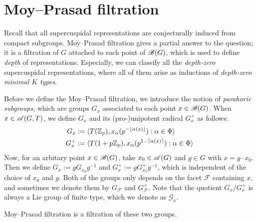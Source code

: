 \section{Moy--Prasad filtration}
\label{sec:moyprasad}

Recall that all supercuspidal representations are conjecturally induced from compact subgroups.
Moy--Prasad filtration gives a partial answer to the question; it is a filtration of $G$ attached to each point of $\mathscr{B}(G)$, which is used to define \emph{depth} of representations.
Especially, we can classify all the \emph{depth-zero} supercuspidal representations, where all of them arise as inductions of \emph{depth-zero minimal $K$ types}.

Before we define the Moy--Prasad filtration, we introduce the notion of \emph{parahoric subgroups}, which are groups $G_{x}$ associated to each point $x \in \mathscr{B}(G)$.
When $x \in \mathscr{A}(G, T)$, we define $G_{x}$ and its (pro-)unipotent radical $G_{x}^+$ as follows:
\begin{align}
    G_{x} &:= \langle T(\mathbb{Z}_p), x_\alpha(p^{-\lfloor \alpha(x) \rfloor}) : \alpha \in \Phi \rangle \\
    G_{x}^+ &:= \langle T(1 + p\mathbb{Z}_p), x_\alpha(p^{1 - \lceil \alpha(x) \rceil}) : \alpha \in \Phi \rangle
\end{align}
Now, for an arbitary point $x \in \mathscr{B}(G)$, take $x_0 \in \mathscr{A}(G)$ and $g \in G$ with $x = g \cdot x_0$.
Then we define $G_{x} := g G_{x_0} g^{-1}$ and $G_{x}^+ := g G_{x_0}^+ g^{-1}$, which is independent of the choice of $x_0$ and $g$.
Both of the groups only depends on the facet $\mathscr{F}$ containing $x$, and sometimes we denote them by $G_{\mathscr{F}}$ and $G_{\mathscr{F}}^+$.
Note that the quotient $G_{x} / G_{x}^+$ is always a Lie group of finite type, which we denote as $\mathscr{G}_{x}$.

Moy--Prasad filtration is a filtration of these two groups.

